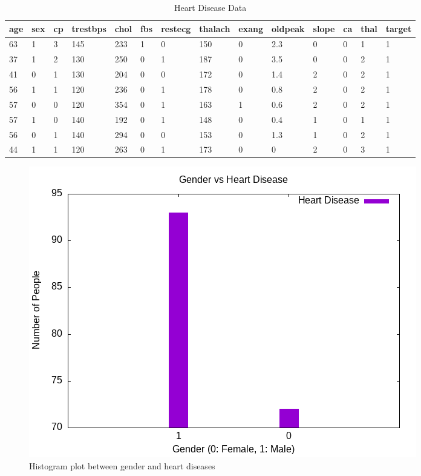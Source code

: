 \documentclass{article}
\begin{document}
	
	\begin{table}[h!]
		\centering
		\caption{Heart Disease Data}
		\label{tb}
		\begin{tabular}{|l|l|l|l|l|l|l|l|l|l|l|l|l|l|}
			\hline
			age & sex & cp & trestbps & chol & fbs & restecg & thalach & exang & oldpeak & slope & ca & thal & target \\ \hline
			63 & 1 & 3 & 145 & 233 & 1 & 0 & 150 & 0 & 2.3 & 0  & 0 & 1 & 1 \\ \hline
			37 & 1 & 2 & 130 & 250 & 0 & 1 & 187 & 0 & 3.5 & 0  & 0 & 2 & 1 \\ \hline
			41 & 0 & 1 & 130 & 204 & 0 & 0 & 172 & 0 & 1.4 & 2  & 0 & 2 & 1 \\ \hline
			56 & 1 & 1 & 120 & 236 & 0 & 1 & 178 & 0 & 0.8 & 2  & 0 & 2 & 1 \\ \hline
			57 & 0 & 0 & 120 & 354 & 0 & 1 & 163 & 1 & 0.6 & 2  & 0 & 2 & 1 \\ \hline
			57 & 1 & 0 & 140 & 192 & 0 & 1 & 148 & 0 & 0.4 & 1  & 0 & 1 & 1 \\ \hline
			56 & 0 & 1 & 140 & 294 & 0 & 0 & 153 & 0 & 1.3 & 1  & 0 & 2 & 1 \\ \hline
			44 & 1 & 1 & 120 & 263 & 0 & 1 & 173 & 0 & 0 & 2  & 0 & 3 & 1 \\ \hline


\end{tabular}

\end{table}

	
	\begin{figure}
			\includegraphics[width=\textwidth]{gender_vs_heart_disease.png}
		\caption{Histogram plot between gender and heart diseases}
		\label{f1}
	\end{figure}
\end{document}
